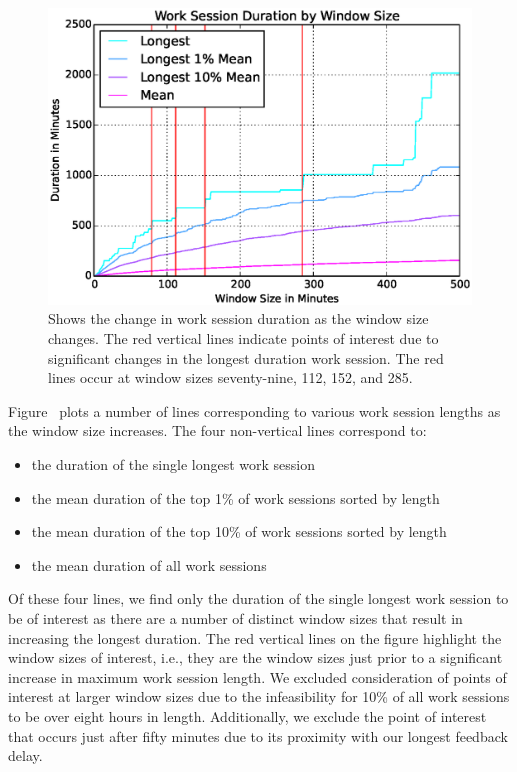 \begin{figure}[!t]
\centering
\includegraphics[width=5.25in]{graphs/Work_Session_Duration_by_Window_Size.eps}
\caption{Shows the change in work session duration as the window size
  changes. The red vertical lines indicate points of interest due to
  significant changes in the longest duration work session. The red lines occur
  at window sizes seventy-nine, 112, 152, and 285.}
\end{figure}

Figure~ plots a number of lines corresponding to
various work session lengths as the window size increases. The four
non-vertical lines correspond to:

\begin{itemize}
\item the duration of the single longest work session
\item the mean duration of the top 1\% of work sessions sorted by length
\item the mean duration of the top 10\% of work sessions sorted by length
\item the mean duration of all work sessions
\end{itemize}

Of these four lines, we find only the duration of the single longest work
session to be of interest as there are a number of distinct window sizes that
result in increasing the longest duration. The red vertical lines on the figure
highlight the window sizes of interest, i.e., they are the window sizes just
prior to a significant increase in maximum work session length. We excluded
consideration of points of interest at larger window sizes due to the
infeasibility for 10\% of all work sessions to be over eight hours in
length. Additionally, we exclude the point of interest that occurs just after
fifty minutes due to its proximity with our longest feedback delay.

